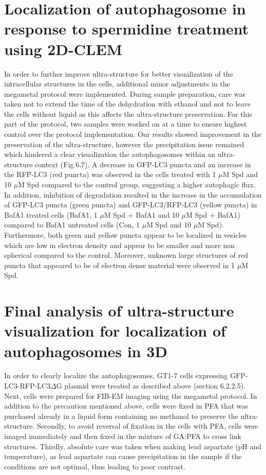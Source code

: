 \section{Localization of autophagosome in response to spermidine treatment using 2D-CLEM}
In order to further improve ultra-structure for better visualization of the intracellular structures in the cells, additional minor adjustments in the megametal protocol were implemented. During sample preparation, care was taken not to extend the time of the dehydration with ethanol and not to leave the cells without liquid as this affects the ultra-structure preservation. For this part of the protocol, two samples were worked on at a time to ensure highest control over the protocol implementation. Our results showed improvement in the preservation of the ultra-structure, however the precipitation issue remained which hindered a clear visualization the autophagosomes within an ultra-structure context (Fig.6.7). A decrease in GFP-LC3 puncta and an increase in the RFP-LC3 (red puncta) was observed in the cells treated with 1 $\mu$M Spd and 10 $\mu$M Spd compared to the control group, suggesting a higher autophagic flux. In addition, inhibition of degradation resulted in the increase in the accumulation of GFP-LC3 puncta  (green puncta)  and GFP-LC3/RFP-LC3 (yellow puncta) in BafA1 treated cells (BafA1, 1 $\mu$M Spd + BafA1 and 10 $\mu$M Spd + BafA1) compared to BafA1 untreated cells (Con, 1 $\mu$M Spd and 10 $\mu$M Spd). Furthermore, both green and yellow puncta appear to be localized in vesicles which are low in electron density and appear to be smaller and more non spherical compared to the control. Moreover, unknown large structures of red puncta that appeared to be of electron dense material were observed in 1 $\mu$M Spd. 


\section{Final analysis of ultra-structure visualization for localization of autophagosomes in 3D}
In order to clearly localize the autophagosomes, GT1-7 cells expressing GFP-LC3-RFP-LC3$\Delta$G plasmid were treated as described above (section 6.2.2.5). Next, cells were prepared for FIB-EM imaging using the megametal protocol. In addition to the precaution mentioned above, cells were fixed in PFA that was purchased already in a liquid form containing no methanol to preserve the ultra-structure. Secondly, to avoid reversal of fixation in the cells with PFA, cells were imaged immediately and then fixed in the mixture of GA:PFA to cross link structures. Thirdly, absolute care was taken when making lead aspartate (pH and temperature), as lead aspartate can cause precipitation in the sample if the conditions are not optimal, thus leading to poor contrast.

